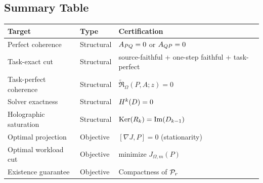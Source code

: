 \subsection{Summary Table}
\label{subsec:target-summary}

\begin{center}
\renewcommand{\arraystretch}{1.3}
\begin{tabular}{@{}lll@{}}
\textbf{Target} & \textbf{Type} & \textbf{Certification} \\
\hline
Perfect coherence & Structural & $A_{PQ} = 0$ or $A_{QP} = 0$ \\
Task-exact cut & Structural & source-faithful + one-step faithful + task-perfect \\
Task-perfect coherence & Structural & $\widetilde{\mathfrak R}_{\Omega}(P,A;z)=0$ \\
Solver exactness & Structural & $H^{k}(D) = 0$ \\
Holographic saturation & Structural & $\mathrm{Ker}(R_k) = \mathrm{Im}(D_{k-1})$ \\
\hline
Optimal projection & Objective & $[\nabla J, P] = 0$ (stationarity) \\
Optimal workload cut & Objective & minimize $J_{\Omega,m}(P)$ \\
Existence guarantee & Objective & Compactness of $\mathcal{P}_{r}$ \\
\end{tabular}
\end{center}
